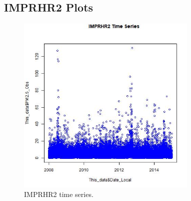 
\subsection*{IMPRHR2 Plots}
\begin{figure} 
\centering 
\includegraphics[width=0.77\textwidth]{Code_Outputs/IMPRHR2_time_series.jpg} 
\caption{\label{fig:IMPRHR2TS}IMPRHR2 time series.} 
\end{figure} 
 
